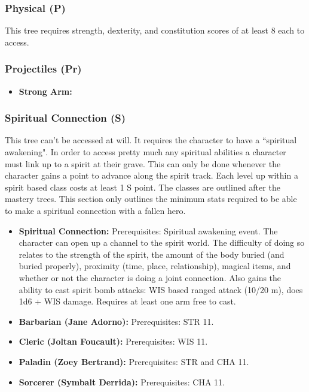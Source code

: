 \documentclass[letterpaper,12pt]{article}
\begin{document}
\subsubsection{Physical (P)}
This tree requires strength, dexterity, and constitution scores of at least 8 each to access. 


\subsubsection{Projectiles (Pr)}

\begin{itemize}
\item \textbf{Strong Arm:} 

\end{itemize}

\subsubsection{Spiritual Connection (S)}
This tree can't be accessed at will. It requires the character to have a ``spiritual awakening". In order to access pretty much any spiritual abilities a character must link up to a spirit at their grave. This can only be done whenever the character gains a point to advance along the spirit track. Each level up within a spirit based class costs at least 1 S point. The classes are outlined after the mastery trees. This section only outlines the minimum stats required to be able to make a spiritual connection with a fallen hero.

\begin{itemize}
\item \textbf{Spiritual Connection:} Prerequisites: Spiritual awakening event. The character can open up a channel to the spirit world. The difficulty of doing so relates to the strength of the spirit, the amount of the body buried (and buried properly), proximity (time, place, relationship), magical items, and whether or not the character is doing a joint connection. Also gains the ability to cast spirit bomb attacks: WIS based ranged attack (10/20 m), does 1d6 + WIS damage. Requires at least one arm free to cast. 
\item \textbf{Barbarian (Jane Adorno):} Prerequisites: STR 11.
\item \textbf{Cleric (Joltan Foucault):} Prerequisites: WIS 11. 
\item \textbf{Paladin (Zoey Bertrand):} Prerequisites: STR and CHA 11.
\item \textbf{Sorcerer (Symbalt Derrida):} Prerequisites: CHA 11.
\end{itemize}
\end{document}
